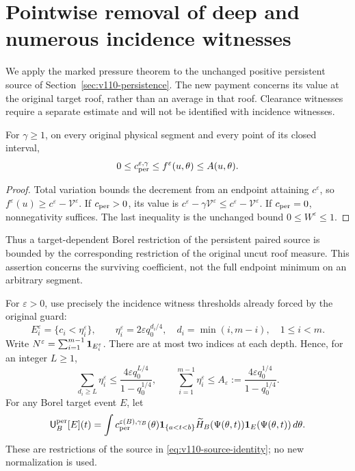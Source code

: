 \section{Pointwise removal of deep and numerous incidence witnesses}
\label{sec:v111-witness}
We apply the marked pressure theorem to the unchanged positive
persistent source of Section~\ref{sec:v110-persistence}. The new
payment concerns its value at the original target roof, rather than
an average in that roof. Clearance witnesses require a separate
estimate and will not be identified with incidence witnesses.

\begin{lemma}
\label{lem:v111-domination}
For $\gamma\ge1$, on every original physical segment and every
point of its closed interval,
\begin{equation}\label{eq:v111-domination}
       0\le c_{\rm per}^{\varepsilon,\gamma}
                         \le f^\varepsilon(u,\theta)\le A(u,\theta).
\end{equation}
\end{lemma}
\begin{proof}
Total variation bounds the decrement from an endpoint attaining
$c^\varepsilon$, so $f^\varepsilon(u)\ge c^\varepsilon-\mathcal V^\varepsilon$.
If $c_{\rm per}>0$, its value is
$c^\varepsilon-\gamma\mathcal V^\varepsilon
\le c^\varepsilon-\mathcal V^\varepsilon$. If $c_{\rm per}=0$,
nonnegativity suffices. The last inequality is the unchanged bound
$0\le W^\varepsilon\le1$.
\end{proof}
Thus a target-dependent Borel restriction of the persistent paired
source is bounded by the corresponding restriction of the original
uncut roof measure. This assertion concerns the surviving coefficient,
not the full endpoint minimum on an arbitrary segment.

For $\varepsilon>0$, use precisely the incidence witness thresholds
already forced by the original guard:
\begin{equation}\label{eq:v111-incidence-witnesses}
 E_i^\varepsilon=\{c_i<\eta_i^\varepsilon\},\qquad
 \eta_i^\varepsilon=2\varepsilon q_0^{d_i/4},\quad
 d_i=\min(i,m-i),\quad 1\le i<m.
\end{equation}
Write $N^\varepsilon=\sum_{i=1}^{m-1}\mathbf1_{E_i^\varepsilon}$.
There are at most two indices at each depth. Hence, for an integer
$L\ge1$,
\begin{equation}\label{eq:v111-depth-sum}
 \sum_{d_i\ge L}\eta_i^\varepsilon
 \le\frac{4\varepsilon q_0^{L/4}}{1-q_0^{1/4}},\qquad
 \sum_{i=1}^{m-1}\eta_i^\varepsilon
 \le A_\varepsilon:=
                  \frac{4\varepsilon q_0^{1/4}}{1-q_0^{1/4}}.
\end{equation}
For any Borel target event $E$, let
\[
 \mathsf U_B^{\rm per}[E](t)=\int
 c_{\rm per}^{\varepsilon(B),\gamma_B}(\theta)
 \mathbf1_{\{a<t<b\}}\widetilde H_B(\Psi(\theta,t))
                   \mathbf1_E(\Psi(\theta,t))\,d\theta.
\]
These are restrictions of the source in
\eqref{eq:v110-source-identity}; no new normalization is used.

